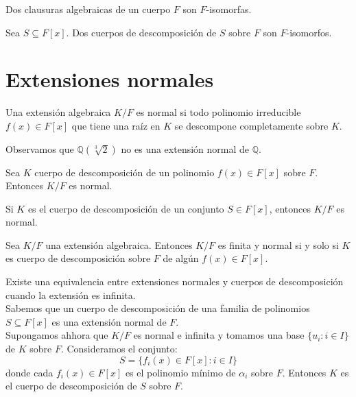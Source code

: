 \begin{corollary}
    Dos clausuras algebraicas de un cuerpo $F$ son $F$-isomorfas.
\end{corollary}

\begin{corollary}
    Sea $S \subseteq F[x]$. Dos cuerpos de descomposición de $S$ sobre $F$ son $F$-isomorfos.
\end{corollary}

\section{Extensiones normales}

\begin{definition}
    Una extensión algebraica $K/F$ es normal si todo polinomio irreducible $f(x) \in F[x]$ que tiene una raíz en $K$ se descompone completamente sobre $K$.
\end{definition}

\begin{example}
    Observamos que $\mathbb{Q}(\sqrt[3]{2})$ no es una extensión normal de $\mathbb{Q}$.
\end{example}

\begin{theorem}
    Sea $K$ cuerpo de descomposición de un polinomio $f(x) \in F[x]$ sobre $F$. Entonces $K/F$ es normal.
\end{theorem}

\begin{remark}
    Si $K$ es el cuerpo de descomposición de un conjunto $S \in F[x]$, entonces $K/F$ es normal.
\end{remark}

\begin{theorem}
    Sea $K/F$ una extensión algebraica. Entonces $K/F$ es finita y normal si y solo si $K$ es cuerpo de descomposición sobre $F$ de algún $f(x) \in F[x]$.
\end{theorem}

\begin{remark}
    Existe una equivalencia entre extensiones normales y cuerpos de descomposición cuando la extensión es infinita.\\
    Sabemos que un cuerpo de descomposición de una familia de polinomios $S \subseteq F[x]$ es una extensión normal de $F$.\\
    Supongamos ahhora que $K/F$ es normal e infinita y tomamos una base $\{ u_i : i \in I \}$ de $K$ sobre $F$. Consideramos el conjunto:
    $$S = \{ f_i(x) \in F[x] : i \in I \}$$
    donde cada $f_i(x) \in F[x]$ es el polinomio mínimo de $\alpha_i$ sobre $F$. Entonces $K$ es el cuerpo de descomposición de $S$ sobre $F$.
\end{remark}

